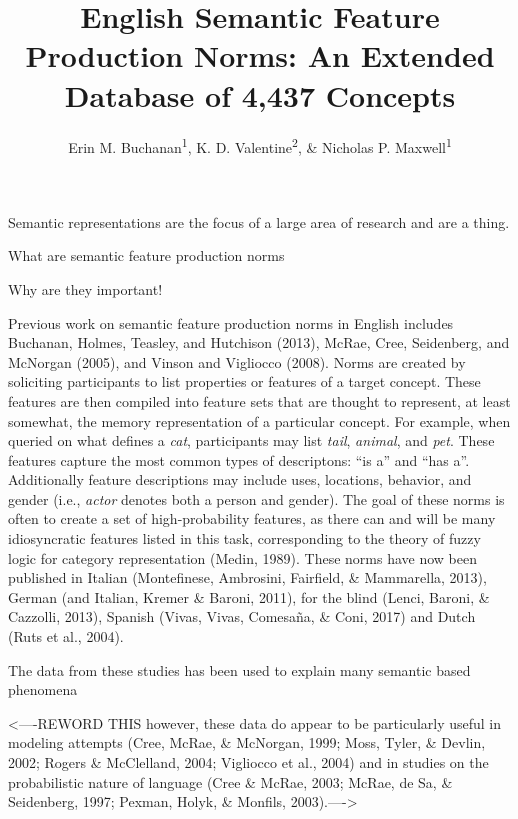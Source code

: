 \documentclass[english,man]{apa6}
\title{English Semantic Feature Production Norms: An Extended Database of 4,437
Concepts}
\author{Erin M. Buchanan\textsuperscript{1}, K. D. Valentine\textsuperscript{2}, \& Nicholas P. Maxwell\textsuperscript{1}}
\affiliation{
    \vspace{0.5cm}
          \textsuperscript{1} Missouri State University\\
          \textsuperscript{2} University of Missouri  }
\theoremstyle{definition}
\theoremstyle{definition}
\theoremstyle{definition}
\theoremstyle{remark}
\begin{document}
\maketitle

\setcounter{secnumdepth}{0}



Semantic representations are the focus of a large area of research and
are a thing.

What are semantic feature production norms

Why are they important!

Previous work on semantic feature production norms in English includes
Buchanan, Holmes, Teasley, and Hutchison (2013), McRae, Cree,
Seidenberg, and McNorgan (2005), and Vinson and Vigliocco (2008). Norms
are created by soliciting participants to list properties or features of
a target concept. These features are then compiled into feature sets
that are thought to represent, at least somewhat, the memory
representation of a particular concept. For example, when queried on
what defines a \emph{cat}, participants may list \emph{tail},
\emph{animal}, and \emph{pet}. These features capture the most common
types of descriptons: \enquote{is a} and \enquote{has a}. Additionally
feature descriptions may include uses, locations, behavior, and gender
(i.e., \emph{actor} denotes both a person and gender). The goal of these
norms is often to create a set of high-probability features, as there
can and will be many idiosyncratic features listed in this task,
corresponding to the theory of fuzzy logic for category representation
(Medin, 1989). These norms have now been published in Italian
(Montefinese, Ambrosini, Fairfield, \& Mammarella, 2013), German (and
Italian, Kremer \& Baroni, 2011), for the blind (Lenci, Baroni, \&
Cazzolli, 2013), Spanish (Vivas, Vivas, Comesaña, \& Coni, 2017) and
Dutch (Ruts et al., 2004).

The data from these studies has been used to explain many semantic based
phenomena

\textless{}----REWORD THIS however, these data do appear to be
particularly useful in modeling attempts (Cree, McRae, \& McNorgan,
1999; Moss, Tyler, \& Devlin, 2002; Rogers \& McClelland, 2004;
Vigliocco et al., 2004) and in studies on the probabilistic nature of
language (Cree \& McRae, 2003; McRae, de Sa, \& Seidenberg, 1997;
Pexman, Holyk, \& Monfils, 2003).----\textgreater{}
\end{document}
